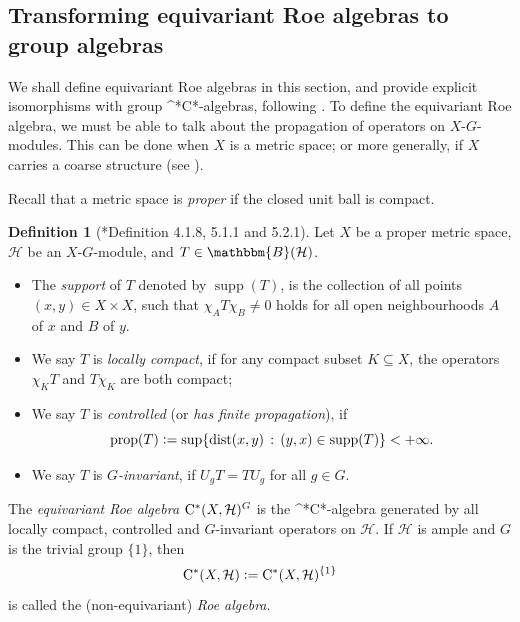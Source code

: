 \documentclass{amsart}
\numberwithin{figure}{section}
\numberwithin{equation}{section}
\numberwithin{table}{section}
\theoremstyle{plain}
\theoremstyle{definition}
\newtheorem{definition}[equation]{Definition}
\theoremstyle{remark}
\theoremstyle{nonumber}
\newcommand{\Bdd}{\mathbb{B}}
\newcommand{\Cst}{\relax\ifmmode\mathrm{C}^*\else\textup{C*}\fi}
\newcommand{\supp}{\operatorname{supp}} %
\newcommand{\defeq}{\mathrel{\vcentcolon=}}
\renewcommand{\mathbb}{\mathbbm} %
\begin{document}
\subsection{Transforming equivariant Roe algebras to group algebras}
\label{sec:mapping_equiv_to_group_alg}
We shall define equivariant Roe algebras in this section, and provide
explicit isomorphisms with group \Cst-algebras, following
\cite{Willett-Yu:Higher_index_theory}. To define the equivariant Roe
algebra, we must be able to talk about the propagation of operators on \( X
\)-\( G \)-modules. This can be done when \( X \) is a metric space; or
more generally, if \( X \) carries a coarse structure (see
\cite{Roe:Lectures_on_coarse_geometry}).

Recall that a metric space is \emph{proper} if the closed unit ball is
compact.

\begin{definition}[\cite{Willett-Yu:Higher_index_theory}*{Definition 4.1.8,
5.1.1 and 5.2.1}]\label{dfn:Roe_algebra}
Let \( X \) be a proper metric space,
\( \mathcal{H} \) be an \( X \)-\( G \)-module, and
\( T\in\Bdd(\mathcal{H}) \).
\begin{itemize}
\item The \emph{support} of \( T \)  
denoted by \( \supp(T) \), is the collection of all points \( (x,y)\in
X\times X \), such that \( \chi_AT\chi_B\neq 0 \)
holds for all open neighbourhoods \( A \) of \( x \) and \( B \) of
\( y \).
\item We say \( T \) is \emph{locally compact}, 
if for any compact subset \( K\subseteq X \), the operators
\( \chi_KT \) and \( T\chi_K \) are both compact;
\item We say \( T \) is \emph{controlled} (or \emph{has finite
propagation}), if
\[ 
    \operatorname{prop}(T)\defeq\sup\{\operatorname{dist}(x,y)\,:\,
    (y,x)\in\supp(T)\}<+\infty.
\]
\item We say \( T \) is \emph{\( G \)-invariant}, if \( U_gT=TU_g \)
for all \( g\in G \). 
\end{itemize}
The \emph{equivariant Roe algebra} \( \Cst(X,\mathcal{H})^G \) is
the \Cst-algebra generated by all locally compact, controlled and \( G
\)-invariant operators on $\mathcal{H}$. 
If \( \mathcal{H} \) is ample and $G$ is the trivial group $\{1\}$, 
then
\[
\Cst(X,\mathcal{H})\defeq \Cst(X,\mathcal{H})^{\{1\}}
\]
is called the (non-equivariant) \emph{Roe algebra}.
\end{definition}
\end{document}
